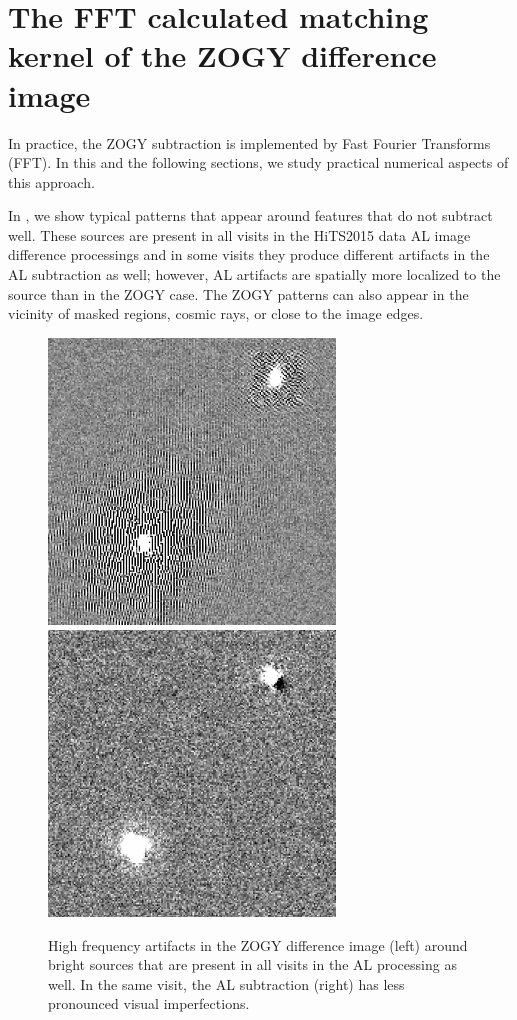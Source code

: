 \documentclass[11pt]{article}
\begin{document}
\section{The FFT calculated matching kernel of the ZOGY difference image\label{sec:ZOGYFFT}}
%
\par In practice, the ZOGY subtraction is implemented by Fast Fourier
Transforms (FFT). In this and the following sections, we study
practical numerical aspects of this approach.
%
\par In , we show typical patterns that appear
around features that do not subtract well. These sources are present in all
visits in the HiTS2015 data AL image difference processings and in some
visits they produce different artifacts in the AL subtraction as well;
however, AL artifacts are spatially more localized to the source than in the
ZOGY case. The ZOGY patterns can also appear in the vicinity of masked
regions, cosmic rays, or close to the image edges.
%
\begin{figure}
\begin{center}
\includegraphics[width=3in]{fig/zogy_artifacts_v412060.png}
\includegraphics[width=3in]{fig/AL_goodvisit_v412060.png}
\end{center}
\caption{\label{fig:hits_zogy_artifacts}High frequency artifacts in the ZOGY
  difference image (left) around bright sources that are present in all
  visits in the AL processing as well. In the same visit, the AL subtraction
  (right) has less pronounced visual imperfections.}
\end{figure}
%
\end{document}
